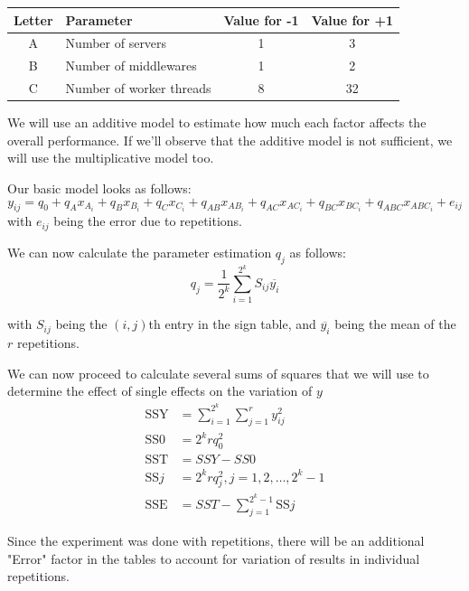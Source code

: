 \documentclass[11pt,a4paper]{article}
\begin{document}
\begin{table}[H]
\centering
\begin{tabular}{@{}clcc@{}}
\toprule
Letter & Parameter & Value for -1 & Value for +1 \\ \midrule
A & Number of servers & 1 & 3 \\
B & Number of middlewares & 1 & 2 \\
C & Number of worker threads & 8 & 32 \\ \bottomrule
\end{tabular}
\end{table}

We will use an additive model to estimate how much each factor affects the overall performance.
If we'll observe that the additive model is not sufficient, we will use the multiplicative model too.

Our basic model looks as follows:
\begin{equation}
	y_{ij} = q_0 + q_A x_{A_i} + q_B x_{B_i} + q_C x_{C_i} + q_{AB} x_{AB_i} + q_{AC} x_{AC_i} + q_{BC} x_{BC_i} + q_{ABC} x_{ABC_i} + e_{ij}
\end{equation}
with $e_{ij}$ being the error due to repetitions.

We can now calculate the parameter estimation $q_j$ as follows:
\begin{equation}
	q_j = \frac{1}{2^k}\sum_{i = 1}^{2^k} S_{ij}\overline{y_i}
\end{equation}

with $S_{ij}$ being the $(i, j)$th entry in the sign table, and $\overline{y_i}$ being the mean of the $r$ repetitions.


We can now proceed to calculate several sums of squares that we will use to determine the effect of single effects on the variation of $y$
\begin{align}
	\text{SSY} &= \sum_{i=1}^{2^k}\sum_{j=1}^{r}y_{ij}^2\\
	\text{SS0} &= 2^krq_0^2\\
	\text{SST} &= SSY - SS0\\
	\text{SS}j &= 2^krq_j^2, j=1, 2, \ldots, 2^k-1\\
	\text{SSE} &= SST - \sum_{j = 1}^{2^k-1}\text{SS}j
\end{align}


Since the experiment was done with repetitions, there will be an additional "Error" factor in the tables
to account for variation of results in individual repetitions.
\end{document}
